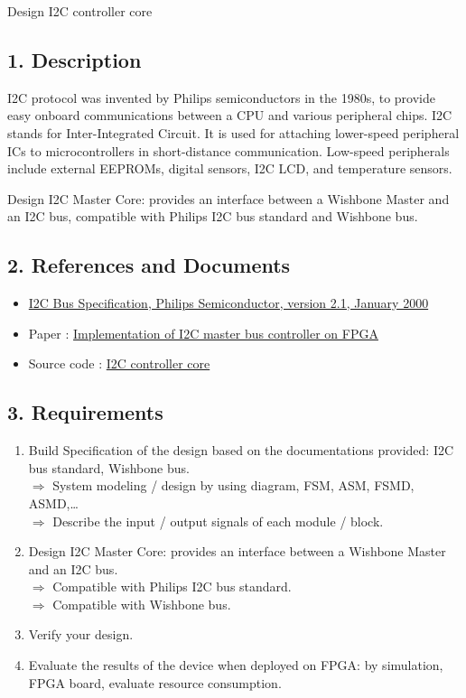 \documentclass{vhdl-assignment}
\begin{document}
\pagebreak
\begin{project}{Design I2C controller core}
    \subsection*{1. Description}
    I2C protocol was invented by Philips semiconductors in the 1980s, to provide easy onboard communications between a CPU and various peripheral chips.
    I2C stands for Inter-Integrated Circuit.
    It is used for attaching lower-speed peripheral ICs to microcontrollers in short-distance communication.
    Low-speed peripherals include external EEPROMs, digital sensors, I2C LCD, and temperature sensors.

    Design I2C Master Core: provides an interface between a Wishbone Master and an I2C bus, compatible with Philips I2C bus standard and Wishbone bus.

    \subsection*{2. References and Documents}
    \begin{itemize}
        \item \href{https://vdocument.in/bus-i2c-philips.html}{I2C Bus Specification, Philips Semiconductor, version 2.1, January 2000}
        \item Paper : \href{https://ieeexplore.ieee.org/document/6577141}{Implementation of I2C master bus controller on FPGA}
        \item Source code : \href{https://github.com/trondd/oc-i2c}{I2C controller core}
    \end{itemize}

    \subsection*{3. Requirements}
    \begin{enumerate}
        \item Build Specification of the design based on the documentations provided: I2C bus standard, Wishbone bus.\\
        $\Rightarrow$ System modeling / design by using diagram, FSM, ASM, FSMD, ASMD,\dots\\
        $\Rightarrow$ Describe the input / output signals of each module / block.
        \item Design I2C Master Core: provides an interface between a Wishbone Master and an I2C bus.\\
        $\Rightarrow$ Compatible with Philips I2C bus standard.\\
        $\Rightarrow$ Compatible with Wishbone bus.
        \item Verify your design.
        \item Evaluate the results of the device when deployed on FPGA: by simulation, FPGA board, evaluate resource consumption.
    \end{enumerate}
\end{project}
\end{document}
